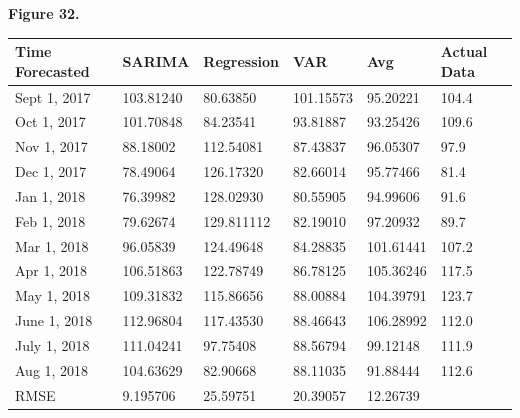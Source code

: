 \documentclass[11pt]{article}
\begin{document}
\begin{center}
\textbf{Figure 32.}
\end{center}
\begin{table}[H]
\centering
\begin{tabular}{l|l|l|l|l|l}
\hline
Time Forecasted & SARIMA & Regression & VAR & Avg & Actual Data \\
\hline
Sept 1, 2017    & 103.81240                & 80.63850           &       101.15573 &  95.20221   &  104.4           \\
\hline
Oct 1, 2017     & 101.70848                & 84.23541           &     93.81887 &   93.25426  &   109.6          \\
\hline
Nov 1, 2017     & 88.18002                 & 112.54081           &      87.43837 &  96.05307   &   97.9          \\
\hline
Dec 1, 2017     &  78.49064                &  126.17320          &     82.66014 &  95.77466   &   81.4          \\
\hline
Jan 1, 2018     &  76.39982                &  128.02930          &     80.55905 &  94.99606   &   91.6          \\
\hline
Feb 1, 2018     &  79.62674                & 129.811112           &     82.19010 &  97.20932   &   89.7          \\
\hline
Mar 1, 2018     &  96.05839                &  124.49648          &     84.28835 & 101.61441   &   107.2          \\
\hline
Apr 1, 2018     &  106.51863               &  122.78749          &     86.78125 &  105.36246   &   117.5          \\
\hline
May 1, 2018    &  109.31832                &  115.86656          &     88.00884 &   104.39791  &   123.7          \\
\hline
June 1, 2018    &  112.96804               &  117.43530          &      88.46643 &  106.28992   &   112.0          \\
\hline
July 1, 2018    &  111.04241               &  97.75408          &     88.56794 &  99.12148   &   111.9          \\
\hline
Aug 1, 2018     &  104.63629               &  82.90668          &     88.11035 &  91.88444   &   112.6         \\
\hline 
\hline
RMSE & 9.195706 & 25.59751 & 20.39057 & 12.26739 & \\
\hline
\end{tabular}
\end{table}
\end{document}
